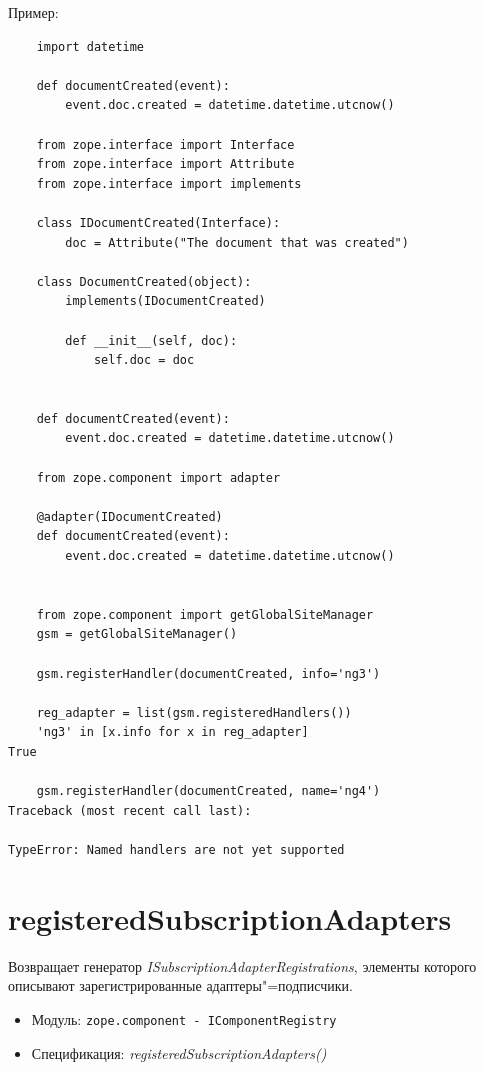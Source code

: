 \documentclass[a4paper,openany,twoside,final]{book}
\providecommand*{\DUroletitlereference}[1]{\textsl{#1}}
\begin{document}
Пример:

\begin{verbatim}
    import datetime

    def documentCreated(event):
        event.doc.created = datetime.datetime.utcnow()

    from zope.interface import Interface
    from zope.interface import Attribute
    from zope.interface import implements

    class IDocumentCreated(Interface):
        doc = Attribute("The document that was created")

    class DocumentCreated(object):
        implements(IDocumentCreated)

        def __init__(self, doc):
            self.doc = doc


    def documentCreated(event):
        event.doc.created = datetime.datetime.utcnow()

    from zope.component import adapter

    @adapter(IDocumentCreated)
    def documentCreated(event):
        event.doc.created = datetime.datetime.utcnow()


    from zope.component import getGlobalSiteManager
    gsm = getGlobalSiteManager()

    gsm.registerHandler(documentCreated, info='ng3')

    reg_adapter = list(gsm.registeredHandlers())
    'ng3' in [x.info for x in reg_adapter]
True

    gsm.registerHandler(documentCreated, name='ng4')
Traceback (most recent call last):

TypeError: Named handlers are not yet supported
\end{verbatim}


\section*{registeredSubscriptionAdapters%
  \label{registeredsubscriptionadapters}%
}

Возвращает генератор \DUroletitlereference{ISubscriptionAdapterRegistrations}, элементы которого описывают зарегистрированные адаптеры"=подписчики.

\begin{itemize}

\item Модуль: \texttt{zope.component - IComponentRegistry}

\item Спецификация: \DUroletitlereference{registeredSubscriptionAdapters()}

\end{itemize}
\end{document}
